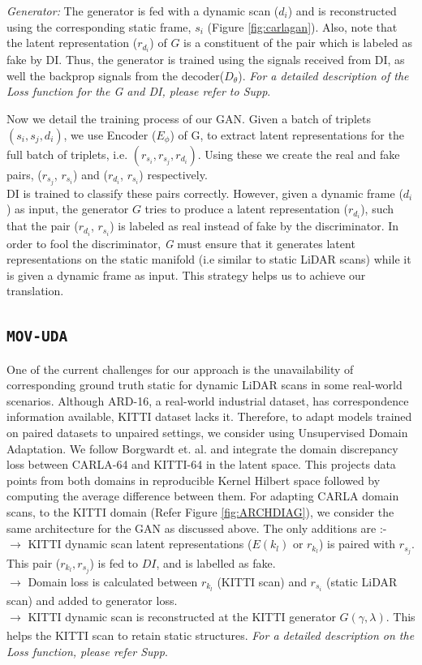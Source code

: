 \documentclass[10pt,twocolumn,letterpaper]{article}
\newcommand{\dslruda}{\texttt{\textbf{MOV-UDA}}}
\begin{document}
\textit{Generator:} The generator is fed with a dynamic scan ($d_i$) and is reconstructed using the corresponding static frame, $s_i$ (Figure \ref{fig:carlagan}). Also, note that the latent representation ($r_{d_i}$) of $G$ is a constituent of the pair which is labeled as fake by DI.
Thus, the generator is trained using the signals received from DI, as well the backprop signals from the decoder($D_{\theta}$).
\textit{For a detailed description of the Loss function for the G and DI, please refer to Supp}.

Now we detail the training process of our GAN.
Given a batch of triplets $(s_i,s_j,d_i)$, we use Encoder ($E_{\phi}$) of G, to extract latent representations for the full batch of triplets, i.e. $(r_{s_i},r_{s_j},r_{d_i})$. 
Using these we create the real and fake pairs, ($r_{s_j}$, $r_{s_i}$) and ($r_{d_i}$, $r_{s_i}$) respectively.\\
DI is trained to classify these pairs correctly.
However, given a dynamic frame ($d_i$) as input, the generator $G$ tries to produce a latent representation ($r_{d_i}$), such that the pair ($r_{d_i}$, $r_{s_i}$) is labeled as real instead of fake by the discriminator. In order to fool the discriminator, \textit{G} must ensure that it generates latent representations on the static manifold (i.e similar to static LiDAR scans) while it is given a dynamic frame as input. This strategy helps us to achieve our translation.

\subsection{\dslruda{} }

One of the current challenges for our approach is the unavailability of corresponding ground truth static for dynamic LiDAR scans in some real-world scenarios. Although ARD-16, a real-world industrial dataset, has correspondence information available, KITTI dataset lacks it. Therefore, to adapt models trained on paired datasets to unpaired settings, we consider using Unsupervised Domain Adaptation. We follow Borgwardt et. al.\cite{Borgwardt2006IntegratingSB} and integrate the domain discrepancy loss between CARLA-64 and KITTI-64 in the latent space. This projects data points from both domains in reproducible Kernel Hilbert space followed by computing the average difference between them. For adapting CARLA domain scans, to the KITTI domain (Refer Figure \ref{fig:ARCHDIAG}), we consider the same architecture for the GAN as discussed above. The only additions are :-  \\$\xrightarrow[]{}$ KITTI dynamic scan latent representations ($E(k_l)$ or $r_{k_l}$) is paired with $r_{s_j}$. This pair ($r_{k_l}, r_{s_j}$) is fed to $DI$, and is labelled as fake. \\
$\xrightarrow[]{}$ Domain loss is calculated between $r_{k_l}$ (KITTI scan) and $r_{s_i}$ (static LiDAR scan) and added to generator loss.\\ 
$\xrightarrow[]{}$ KITTI dynamic scan is reconstructed at the KITTI generator $G(\gamma, \lambda)$. This helps the KITTI scan to retain static structures. \textit{For a detailed description on the Loss function, please refer Supp}.
\end{document}
